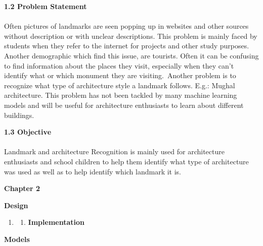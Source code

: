 \documentclass[10pt]{article} %
\begin{document}
\begin{spacing}{1.5}
\vspace{5mm}

\noindent \textbf{\large 1.2 Problem Statement}

\paragraph{}
\justifying
\noindent Often pictures of landmarks are seen popping up in websites and other sources without description or with unclear descriptions. This problem is mainly faced by students when they refer to the internet for projects and other study purposes. Another demographic which find this issue, are tourists. Often it can be confusing to find information about the places they visit, especially when they can't identify what or which monument they are visiting.~Another problem is to recognize what type of architecture style a landmark follows. E.g.: Mughal architecture. This problem has not been tackled by many machine learning models and will be useful for architecture enthusiasts to learn about different buildings.

\vspace{5mm}
\noindent \textbf{\large 1.3 Objective}

\paragraph{}
\justifying
\noindent Landmark and architecture Recognition is mainly used for architecture enthusiasts and school children to help them identify what type of architecture was used as well as to help identify which landmark it is.
\end{spacing}
\newpage 
\begin{Center}


\noindent \textbf{\Large Chapter 2}

\vspace{10mm}

\noindent \textbf{\Large Design}
\end{Center}
\textbf{}

\begin{enumerate}
\item \begin{enumerate}
\item \textbf{\large  Implementation }
\end{enumerate}
\end{enumerate}

\noindent \textbf{Models }
\vspace{5mm}
\noindent \textbf{}
\end{document}
